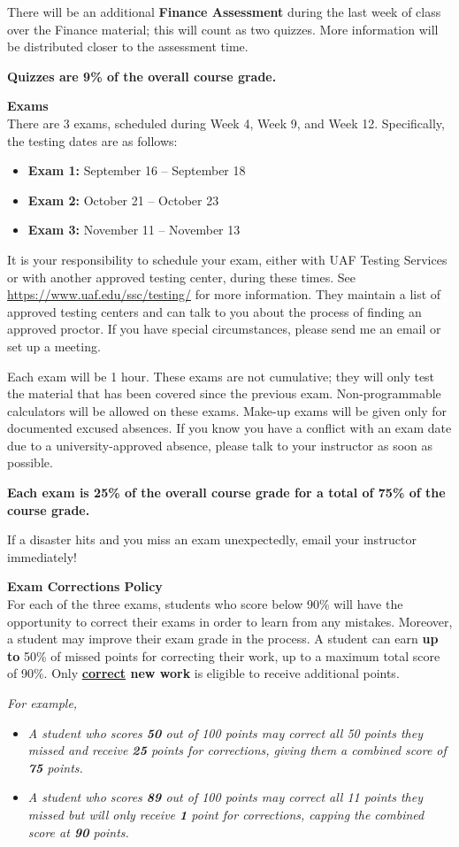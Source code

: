\documentclass[11pt]{article}
\renewcommand{\emph}[1]{\textsf{\textbf{#1}}}
\newcommand{\localhead}[1]{\par\smallskip\textbf{#1} \smallskip\nobreak\\}%
\def\heading#1{\localhead{\large\emph{#1}}}
\def\subheading#1{\localhead{\emph{#1}}}
\begin{document}
There will be an additional \emph{Finance Assessment} during the last week of class over the Finance material; this will count as two quizzes. More information will be distributed closer to the assessment time.

\emph{Quizzes are 9\% of the overall course
grade.}

\heading{Exams}
There are 3 exams, scheduled during Week 4, Week 9, and Week 12. Specifically, the testing dates are as follows:
\begin{itemize}
\item \emph{Exam 1:} September 16 -- September 18
\item \emph{Exam 2:} October 21 -- October 23
\item \emph{Exam 3:} November 11 -- November 13
\end{itemize}

It is your responsibility to schedule your exam, either with UAF Testing Services or with another approved testing center, during these times. See \url{https://www.uaf.edu/ssc/testing/} for more information. They maintain a list of approved testing centers and can talk to you about the process of finding an approved proctor. If you have special circumstances, please send me an email or set up a meeting.

Each exam will be 1 hour. These exams are not cumulative; they will only test the material that has been covered since the previous exam. Non-programmable calculators will be allowed on these exams. Make-up exams will be given only for documented excused absences. If you know you have a conflict with an exam date due to a university-approved absence, please talk to your instructor as soon as possible.

\emph{Each  exam is 25\% of the overall course grade for a total of 75\% of the course grade.}

If a disaster hits and you miss an exam unexpectedly, email your instructor immediately!

\subheading{Exam Corrections Policy}
For each of the three exams, students who score below 90\% will have the opportunity to correct their exams in order to learn from any mistakes. Moreover, a student may improve their exam grade in the process. A student can earn \emph{up to} 50\% of missed points for correcting their work, up to a maximum total score of 90\%. Only \emph{\underline{correct} new work} is eligible to receive additional points.
{\it For example,
\begin{itemize}
\item {\it A student who scores {\bf 50} out of 100 points may
correct all 50 points they missed and receive {\bf 25} points for
corrections, giving them a combined score of {\bf 75} points.}
\item {\it A student who scores {\bf 89} out of 100 points may
correct all 11 points they missed but will only receive {\bf 1} point
for corrections, capping the combined score at {\bf 90} points.}
\end{itemize}
}
\end{document}
